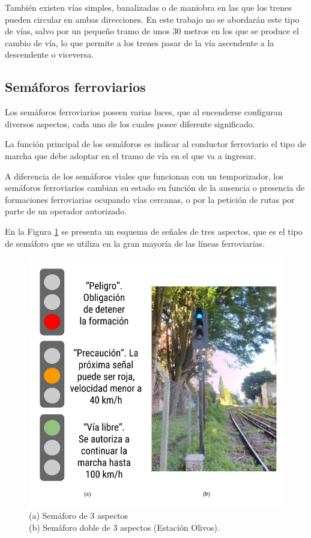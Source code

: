 			También existen vías simples, banalizadas o de maniobra en las que los trenes pueden circular en ambas direcciones. En este trabajo no se abordarán este tipo de vías, salvo por un pequeño tramo de unos 30 metros en los que se produce el cambio de vía, lo que permite a los trenes pasar de la vía ascendente a la descendente o viceversa.
			
		\subsection{Semáforos ferroviarios}
			
			Los semáforos ferroviarios poseen varias luces, que al encenderse configuran diversos aspectos, cada uno de los cuales posee diferente significado.
			
			La función principal de los semáforos es indicar al conductor ferroviario el tipo de marcha que debe adoptar en el tramo de vía en el que va a ingresar.
			
			A diferencia de los semáforos viales que funcionan con un temporizador, los semáforos ferroviarios cambian su estado en función de la ausencia o presencia de formaciones ferroviarias ocupando vías cercanas, o por la petición de rutas por parte de un operador autorizado.
			
			En la Figura \ref{fig:Sem_3Aspectos} se presenta un esquema de señales de tres aspectos, que es el tipo de semáforo que se utiliza en la gran mayoría de las líneas ferroviarias.
						 	
			 \begin{figure}[htbp!]
				\centering
				\includegraphics[scale=.33]{./Figures/Sem3}
				\caption{(a) Semáforo de 3 aspectos\\(b) Semáforo doble de 3 aspectos (Estación Olivos).}
				\label{fig:Sem_3Aspectos}
			\end{figure}
	
